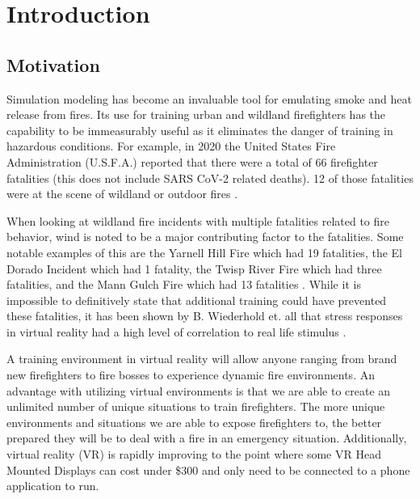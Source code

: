 
\chapter{Introduction} %

\label{ChapterX} %


\section{Motivation}

Simulation modeling has become an invaluable tool for emulating smoke and heat release from fires. Its use for training urban and wildland firefighters has the capability to be immeasurably useful as it eliminates the danger of training in hazardous conditions. For example, in 2020 the United States Fire Administration (U.S.F.A.) reported that there were a total of 66 firefighter fatalities (this does not include SARS CoV-2 related deaths). 12 of those fatalities were at the scene of wildland or outdoor fires \cite{FireFatalities}.

When looking at wildland fire incidents with multiple fatalities related to fire behavior, wind is noted to be a major contributing factor to the fatalities. Some notable examples of this are the Yarnell Hill Fire which had 19 fatalities\cite{yarnellhillfire_2013}, the El Dorado Incident which had 1 fatality\cite{ElDorado}, the Twisp River Fire which had three fatalities\cite{Twisp}, and the Mann Gulch Fire which had 13 fatalities \cite{mannGulch}. While it is impossible to definitively state that additional training could have prevented these fatalities, it has been shown by B. Wiederhold et. all that stress responses in virtual reality had a high level of correlation to real life stimulus  \cite{Wiederhold200310AI}.

\par
A training environment in virtual reality will allow anyone ranging from brand new  firefighters to fire bosses to experience dynamic fire environments. An advantage with utilizing virtual environments is that we are able to create an unlimited number of unique situations to train firefighters. The more unique environments and situations we are able to expose firefighters to, the better prepared they will be to deal with a fire in an emergency situation. Additionally, virtual reality (VR) is rapidly improving to the point where some VR Head Mounted Displays can cost under \$300 and only need to be connected to a phone application to run\cite{Quest}.   \par

